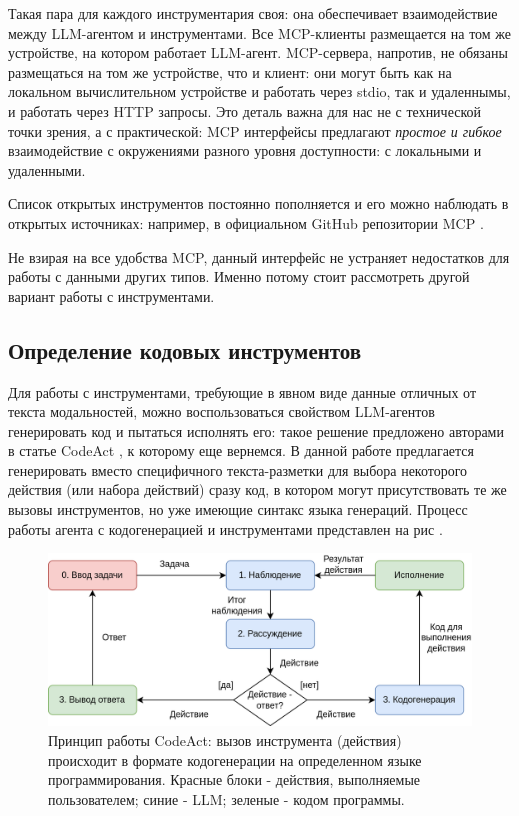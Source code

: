 Такая пара для каждого инструментария своя: она обеспечивает взаимодействие между 
LLM-агентом и инструментами. Все MCP-клиенты размещается на том же устройстве, 
на котором работает LLM-агент. MCP-сервера, напротив, не обязаны размещаться на том же 
устройстве, что и клиент: они могут быть как на локальном вычислительном устройстве и 
работать через stdio, так и удаленнымы, и работать через HTTP запросы. 
Это деталь важна для нас не с технической точки зрения, а с практической: MCP интерфейсы 
предлагают \textit{простое и гибкое} взаимодействие с окружениями разного уровня доступности: с локальными и 
удаленными.

Список открытых инструментов постоянно пополняется и его можно наблюдать в открытых
источниках: например, в официальном GitHub репозитории MCP \cite{mcp-servers}. 

Не взирая на все удобства MCP, данный интерфейс не устраняет недостатков для работы с 
данными других типов. Именно потому стоит рассмотреть другой вариант работы 
с инструментами.

\subsection{Определение кодовых инструментов} \label{ch2:sec1:subsec3}

Для работы с инструментами, требующие в явном виде данные отличных от текста модальностей,
можно воспользоваться свойством LLM-агентов генерировать код и пытаться исполнять его:
такое решение предложено авторами в статье CodeAct \cite{codeact}, к которому еще вернемся.
В данной работе предлагается генерировать вместо специфичного текста-разметки для выбора 
некоторого действия (или набора действий) сразу код, в котором могут присутствовать 
те же вызовы инструментов, но уже имеющие синтакс языка генераций. Процесс работы агента
с кодогенерацией и инструментами представлен на рис .

\begin{figure}
    \center
	\includegraphics[scale=0.24]{sources/codeact_schema.drawio.png}
	\caption{Принцип работы CodeAct: вызов инструмента (действия) происходит в формате
кодогенерации на определенном языке программирования. Красные блоки - действия, 
выполняемые пользователем; синие - LLM; зеленые - кодом программы.} 
	\label{fig:ch2:codetools}  
\end{figure}

